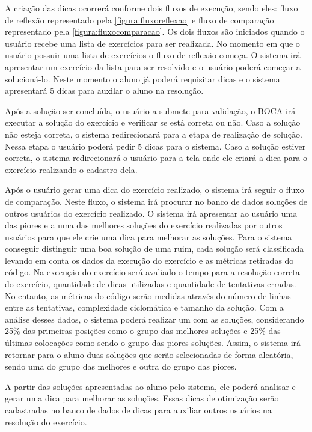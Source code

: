A criação das dicas ocorrerá conforme dois fluxos de execução, sendo eles: fluxo de reflexão representado pela \cref{figura:fluxoreflexao} e fluxo de comparação representado pela \cref{figura:fluxocomparacao}. Os dois fluxos são iniciados quando o usuário recebe uma lista de exercícios para ser realizada. No momento em que o usuário possuir uma lista de exercícios o fluxo de reflexão começa. O sistema irá apresentar um exercício da lista para ser resolvido e o usuário poderá começar a solucioná-lo. Neste momento o aluno já poderá requisitar dicas e o sistema apresentará 5 dicas para auxilar o aluno na resolução.

Após a solução ser concluída, o usuário a submete para validação, o BOCA irá executar a solução do exercício e verificar se está correta ou não. Caso a solução não esteja correta, o sistema redirecionará para a etapa de realização de solução. Nessa etapa o usuário poderá pedir 5 dicas para o sistema. Caso a solução estiver correta, o sistema redirecionará o usuário para a tela onde ele criará a dica para o exercício realizando o cadastro dela.

Após o usuário gerar uma dica do exercício realizado, o sistema irá seguir o fluxo de comparação. Neste fluxo, o sistema irá procurar no banco de dados soluções de outros usuários do exercício realizado. O sistema irá apresentar ao usuário uma das piores e a uma das melhores soluções do exercício realizadas por outros usuários para que ele crie uma dica para melhorar as soluções. Para o sistema conseguir distinguir uma boa solução de uma ruim, cada solução será classificada levando em conta os dados da execução do exercício e as métricas retiradas do código. Na execução do exercício será avaliado o tempo para a resolução correta do exercício, quantidade de dicas utilizadas e quantidade de tentativas erradas. No entanto, as métricas do código serão medidas através do número de linhas entre as tentativas, complexidade ciclomática e tamanho da solução. Com a análise desses dados, o sistema poderá realizar um  com as soluções, considerando 25\% das primeiras posições como o grupo das melhores soluções e 25\% das últimas colocações como sendo o grupo das piores soluções. Assim, o sistema irá retornar para o aluno duas soluções que serão selecionadas de forma aleatória, sendo uma do grupo das melhores e outra do grupo das piores.

A partir das soluções apresentadas ao aluno pelo sistema, ele poderá analisar e gerar uma dica para melhorar as soluções. Essas dicas de otimização serão cadastradas no banco de dados de dicas para auxiliar outros usuários na resolução do exercício.

